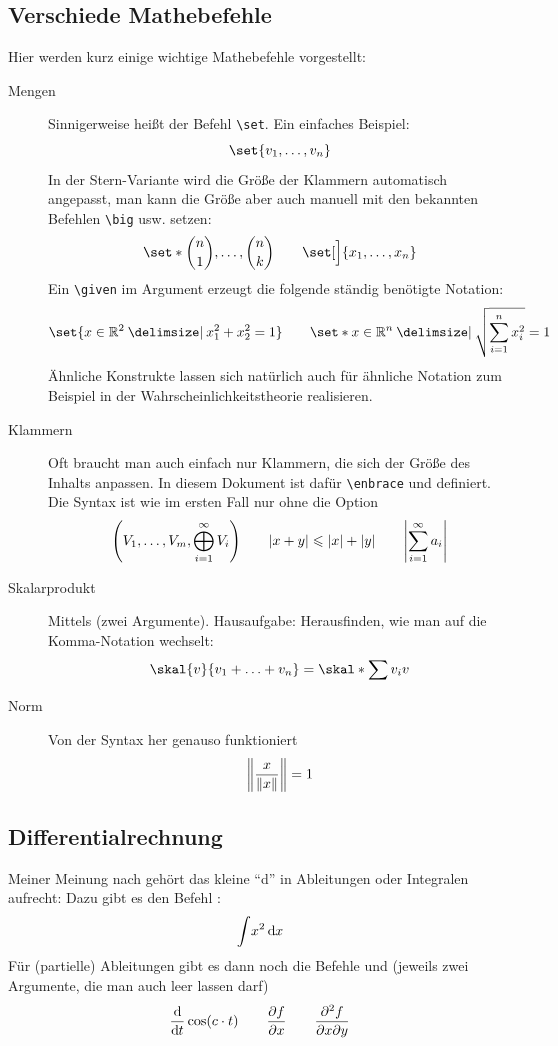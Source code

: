 \subsection{Verschiede Mathebefehle} %
Hier werden kurz einige wichtige Mathebefehle vorgestellt:
\begin{description}
	\item[Mengen] Sinnigerweise heißt der Befehl \texttt{\textbackslash{}set}. Ein einfaches Beispiel:
	\[
		\set{v_1,\ldots ,v_n}
	\]
	In der Stern-Variante wird die Größe der Klammern automatisch angepasst, man kann die Größe aber auch manuell mit den bekannten Befehlen \texttt{\textbackslash{}big} 
	usw. setzen:
	\[
		\set*{ \binom{n}{1}, \ldots , \binom{n}{k} } \qquad \set[\Big]{x_1, \ldots ,x_n}
	\]
	Ein \texttt{\textbackslash{}given} im Argument erzeugt die folgende ständig benötigte Notation:
	\[
		\set{x \in \mathbb{R}^2 \given x_1^2 + x_2^2=1} \qquad \set*{ x \in \mathbb{R}^n \given \sqrt{\sum_{i=1}^{n} x_i^2}=1}
	\]
	Ähnliche Konstrukte lassen sich natürlich auch für ähnliche Notation zum Beispiel in der Wahrscheinlichkeitstheorie realisieren.
	\item[Klammern] Oft braucht man auch einfach nur Klammern, die sich der Größe des Inhalts anpassen. In diesem Dokument ist dafür \texttt{\textbackslash{}enbrace} und 
	 definiert. Die Syntax ist wie im ersten Fall nur ohne die  Option
	\[
		\enbrace*{V_1, \ldots ,V_m , \bigoplus_{i=1}^\infty V_i}  \qquad \abs*{x+y} \le \abs{x} + \abs{y} \qquad \abs*{\sum_{i=1}^{\infty} a_i}   
	\]
	\item[Skalarprodukt] Mittels   (zwei Argumente). Hausaufgabe: Herausfinden, wie man auf die Komma-Notation wechselt:
	\[
		\skal{v}{v_1 + \ldots + v_n} = \skal*{\sum v_i}{v}
	\]
	\item[Norm] Von der Syntax her genauso funktioniert 
	\[
		\norm*{\frac{x}{\norm{x} } } =1
	\]
\end{description}

\subsection{Differentialrechnung} %
Meiner Meinung nach gehört das kleine \enquote{d} in Ableitungen oder Integralen aufrecht: Dazu gibt es den Befehl :
\[
	\int\! x^2 \, \mathd x
\]
Für (partielle) Ableitungen gibt es dann noch die Befehle  und  (jeweils zwei Argumente, die man auch leer lassen darf)
\[
	\diffd{}{t} \cos (c \cdot t) \qquad \diff{f}{x} \qquad \diff{^2 f}{x \partial y}
\]

